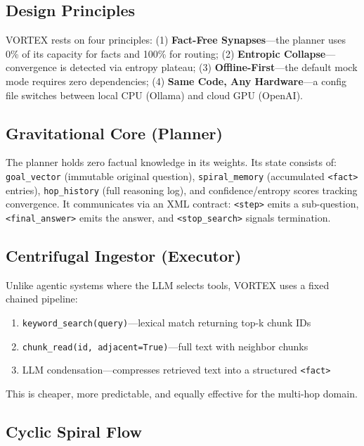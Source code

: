\documentclass{zapiski}
\begin{document}
\subsection{Design Principles}

VORTEX rests on four principles: (1) \textbf{Fact-Free Synapses}---the planner uses 0\% of its capacity for facts and 100\% for routing; (2) \textbf{Entropic Collapse}---convergence is detected via entropy plateau; (3) \textbf{Offline-First}---the default mock mode requires zero dependencies; (4) \textbf{Same Code, Any Hardware}---a config file switches between local CPU (Ollama) and cloud GPU (OpenAI).

\subsection{Gravitational Core (Planner)}

The planner holds zero factual knowledge in its weights. Its state consists of: \texttt{goal\_vector} (immutable original question), \texttt{spiral\_memory} (accumulated \texttt{<fact>} entries), \texttt{hop\_history} (full reasoning log), and confidence/entropy scores tracking convergence. It communicates via an XML contract: \texttt{<step>} emits a sub-question, \texttt{<final\_answer>} emits the answer, and \texttt{<stop\_search>} signals termination.

\subsection{Centrifugal Ingestor (Executor)}

Unlike agentic systems where the LLM selects tools, VORTEX uses a fixed chained pipeline:
\begin{enumerate}
    \item \texttt{keyword\_search(query)}---lexical match returning top-k chunk IDs
    \item \texttt{chunk\_read(id, adjacent=True)}---full text with neighbor chunks
    \item LLM condensation---compresses retrieved text into a structured \texttt{<fact>}
\end{enumerate}
This is cheaper, more predictable, and equally effective for the multi-hop domain.

\subsection{Cyclic Spiral Flow}
\end{document}
